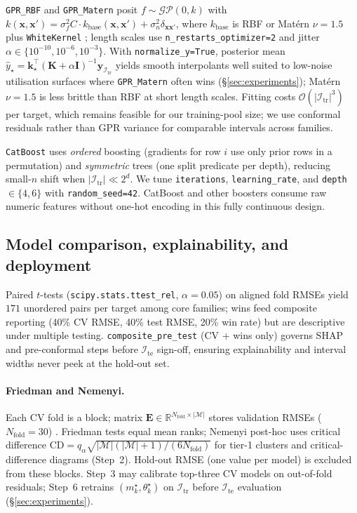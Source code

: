 \documentclass[10pt,twocolumn]{article}
\newcommand{\R}{\mathbb{R}}
\newcommand{\train}{\mathcal{I}_{\mathrm{tr}}}
\newcommand{\test}{\mathcal{I}_{\mathrm{te}}}
\begin{document}
\texttt{GPR\_RBF} and \texttt{GPR\_Matern} posit $f \sim \mathcal{GP}(0,k)$ with
$k(\mathbf{x},\mathbf{x}') = \sigma_f^2 C \cdot k_{\mathrm{base}}(\mathbf{x},\mathbf{x}') + \sigma_n^2 \delta_{\mathbf{x}\mathbf{x}'}$,
where $k_{\mathrm{base}}$ is RBF or Mat\'ern $\nu{=}1.5$ plus \texttt{WhiteKernel} \citep{santner2003design,forrester2008}; length scales use \texttt{n\_restarts\_optimizer=2} and jitter $\alpha \in \{10^{-10},10^{-6},10^{-3}\}$.
With \texttt{normalize\_y=True}, posterior mean
$\hat{y}_\star = \mathbf{k}_\star^\top (\mathbf{K}+\alpha\mathbf{I})^{-1}\mathbf{y}_{\train}$
yields smooth interpolants well suited to low-noise utilisation surfaces where \texttt{GPR\_Matern} often wins (\S\ref{sec:experiments}); Mat\'ern $\nu{=}1.5$ is less brittle than RBF at short length scales.
Fitting costs $\mathcal{O}(|\train|^3)$ per target, which remains feasible for our training-pool size; we use conformal residuals rather than GPR variance for comparable intervals across families.

\texttt{CatBoost} \citep{bentejac2019} uses \emph{ordered} boosting (gradients for row $i$ use only prior rows in a permutation) and \emph{symmetric} trees (one split predicate per depth), reducing small-$n$ shift when $|\train| \ll 2^d$.
We tune \texttt{iterations}, \texttt{learning\_rate}, and \texttt{depth} $\in \{4,6\}$ with \texttt{random\_seed=42}.
CatBoost and other boosters consume raw numeric features without one-hot encoding in this fully continuous design.

\subsection{Model comparison, explainability, and deployment}
\label{sec:method-compare}

Paired $t$-tests (\texttt{scipy.stats.ttest\_rel}, $\alpha{=}0.05$) on aligned fold RMSEs yield $171$ unordered pairs per target among core families; wins feed composite reporting (40\% CV RMSE, 40\% test RMSE, 20\% win rate) but are descriptive under multiple testing.
\texttt{composite\_pre\_test} (CV + wins only) governs SHAP and pre-conformal steps before $\test$ sign-off, ensuring explainability and interval widths never peek at the hold-out set.

\paragraph{Friedman and Nemenyi.}
Each CV fold is a block; matrix $\mathbf{E} \in \R^{N_{\mathrm{fold}} \times |\mathcal{M}|}$ stores validation RMSEs ($N_{\mathrm{fold}}{=}30$) \citep{demvsar2006statistical,nemenyi1963distribution,jia2025pairwise}.
Friedman tests equal mean ranks; Nemenyi post-hoc uses critical difference
$\mathrm{CD} = q_\alpha \sqrt{|\mathcal{M}|(|\mathcal{M}|+1)/(6N_{\mathrm{fold}})}$ for tier-1 clusters and critical-difference diagrams (Step~2).
Hold-out RMSE (one value per model) is excluded from these blocks.
Step~3 may calibrate top-three CV models on out-of-fold residuals; Step~6 retrains $(m^\star_k,\theta^\star_k)$ on $\train$ before $\test$ evaluation (\S\ref{sec:experiments}).
\end{document}
